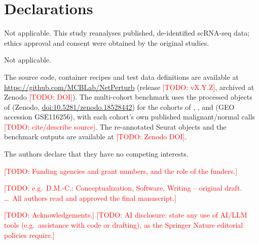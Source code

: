 \documentclass[pdflatex,sn-vancouver-num]{sn-jnl}%
\newcommand{\todo}[1]{\textcolor{red}{[TODO: #1]}}
\begin{document}
\section*{Declarations}

Not applicable. This study reanalyses published, de-identified scRNA-seq data; ethics approval and consent were obtained by the original studies.

Not applicable.

The source code, container recipes and test data definitions are available at \url{https://github.com/MCBLab/NetPerturb} (release \todo{vX.Y.Z}, archived at Zenodo \todo{DOI}). The multi-cohort benchmark uses the processed objects of \citet{Zeng2025bonemarrowmap} (Zenodo, \href{https://doi.org/10.5281/zenodo.18528442}{doi:10.5281/zenodo.18528442}) for the cohorts of \citet{BeneytoCalabuig2023aml}, \citet{Lasry2023aml}, \citet{Naldini2023aml} and \citet{vanGalen2019aml} (GEO accession GSE116256), with each cohort's own published malignant/normal calls \todo{cite/describe source}. The re-annotated Seurat objects and the benchmark outputs are available at \todo{Zenodo DOI}.

The authors declare that they have no competing interests.

\todo{Funding agencies and grant numbers, and the role of the funders.}

\todo{e.g.\ D.M.-C.: Conceptualization, Software, Writing -- original draft. \ldots\ All authors read and approved the final manuscript.}

\todo{Acknowledgements.} \todo{AI disclosure: state any use of AI/LLM tools (e.g.\ assistance with code or drafting), as the Springer Nature editorial policies require.}


\end{document}
